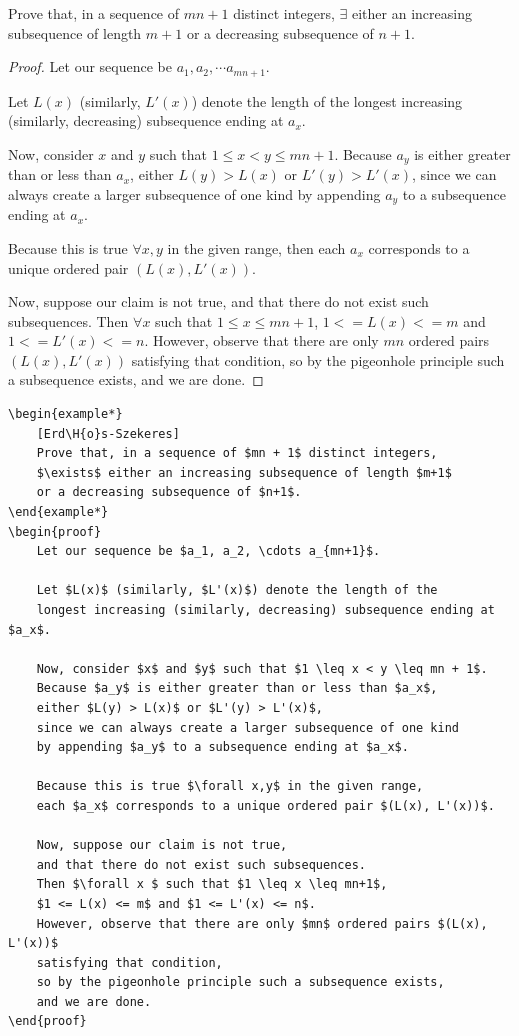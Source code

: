 \documentclass[a4paper]{scrartcl}
\begin{document}
\begin{example*}
	Prove that, in a sequence of $mn + 1$ distinct integers, $\exists$ either an increasing subsequence of length $m+1$ or a decreasing subsequence of $n+1$.
\end{example*}
\begin{proof}
	Let our sequence be $a_1, a_2, \cdots a_{mn+1}$.

	Let $L(x)$ (similarly, $L'(x)$) denote the length of the longest increasing (similarly, decreasing) subsequence ending at $a_x$.

	Now, consider $x$ and $y$ such that $1 \leq x < y \leq mn + 1$. Because $a_y$ is either greater than or less than $a_x$, either $L(y) > L(x)$ or $L'(y) > L'(x)$, since we can always create a larger subsequence of one kind by appending $a_y$ to a subsequence ending at $a_x$.

	Because this is true $\forall x,y$ in the given range, then each $a_x$ corresponds to a unique ordered pair $(L(x), L'(x))$.

	Now, suppose our claim is not true, and that there do not exist such subsequences. Then $\forall x $ such that $1 \leq x \leq mn+1$, $1 <= L(x) <= m$ and $1 <= L'(x) <= n$. However, observe that there are only $mn$ ordered pairs $(L(x), L'(x))$ satisfying that condition, so by the pigeonhole principle such a subsequence exists, and we are done.

\end{proof}
\begin{verbatim}
\begin{example*}
	[Erd\H{o}s-Szekeres]
	Prove that, in a sequence of $mn + 1$ distinct integers, 
	$\exists$ either an increasing subsequence of length $m+1$ 
	or a decreasing subsequence of $n+1$.
\end{example*}
\begin{proof}
	Let our sequence be $a_1, a_2, \cdots a_{mn+1}$.

	Let $L(x)$ (similarly, $L'(x)$) denote the length of the 
	longest increasing (similarly, decreasing) subsequence ending at $a_x$.

	Now, consider $x$ and $y$ such that $1 \leq x < y \leq mn + 1$. 
	Because $a_y$ is either greater than or less than $a_x$, 
	either $L(y) > L(x)$ or $L'(y) > L'(x)$, 
	since we can always create a larger subsequence of one kind 
	by appending $a_y$ to a subsequence ending at $a_x$.

	Because this is true $\forall x,y$ in the given range, 
	each $a_x$ corresponds to a unique ordered pair $(L(x), L'(x))$.

	Now, suppose our claim is not true, 
	and that there do not exist such subsequences. 
	Then $\forall x $ such that $1 \leq x \leq mn+1$,
	$1 <= L(x) <= m$ and $1 <= L'(x) <= n$. 
	However, observe that there are only $mn$ ordered pairs $(L(x), L'(x))$ 
	satisfying that condition, 
	so by the pigeonhole principle such a subsequence exists, 
	and we are done.
\end{proof}
\end{verbatim}
\end{document}

